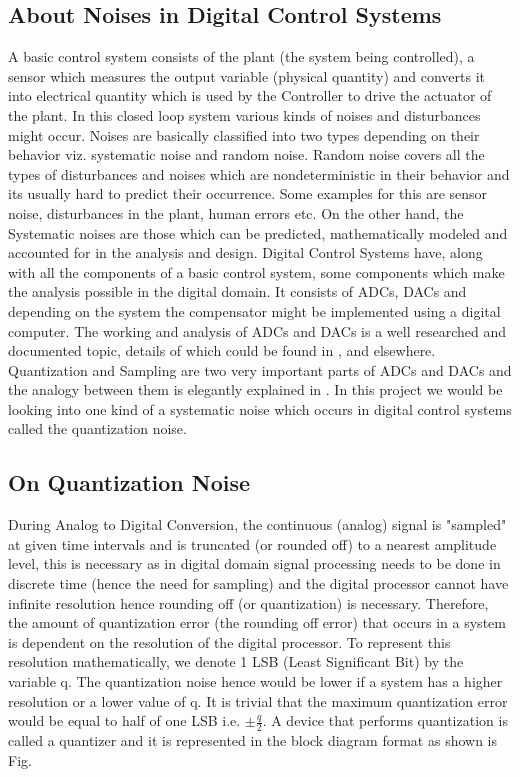 \documentclass[colorlinks=true,pdfstartview=FitV,linkcolor=blue,
            citecolor=red,urlcolor=magenta]{ligodoc}
\begin{document}
\subsection{About Noises in Digital Control Systems} A basic control system consists of the plant (the system being controlled), a sensor which measures the output variable (physical quantity) and converts it into electrical quantity which is used by the Controller to drive the actuator of the plant. In this closed loop system various kinds of noises and disturbances might occur. Noises are basically classified into two types depending on their behavior viz. systematic noise and random noise. Random noise covers all the types of disturbances and noises which are nondeterministic in their behavior and its usually hard to predict their occurrence. Some examples for this are sensor noise, disturbances in the plant, human errors etc. On the other hand, the Systematic noises are those which can be predicted, mathematically modeled  and accounted for in the analysis and design.
Digital Control Systems have, along with all the components of a basic control system, some components which make the analysis possible in the digital domain. It consists of ADCs, DACs and depending on the system the compensator might be implemented using a digital computer. The working and analysis of ADCs and DACs is a well researched and documented topic, details of which could be found in \cite{Tretter}, \cite{Sheingold} and elsewhere. Quantization and Sampling are two very important parts of ADCs and DACs and the analogy between them is elegantly explained in \cite{Kollar}. In this project we would be looking into one kind of a systematic noise which occurs in digital control systems called the quantization noise.
\subsection{On Quantization Noise} During Analog to Digital Conversion, the continuous (analog) signal is "sampled" at given time intervals and is truncated (or rounded off) to a nearest amplitude level, this is necessary as in digital domain signal processing needs to be done in discrete time (hence the need for sampling) and the digital processor cannot have infinite resolution hence rounding off (or quantization) is necessary. Therefore, the amount of quantization error (the rounding off error) that occurs in a system is dependent on the resolution of the digital processor. To represent this resolution mathematically, we denote 1 LSB (Least Significant Bit) by the variable q. The quantization noise hence would be lower if a system has a higher resolution or a lower value of q. It is trivial that the maximum quantization error would be equal to half of one LSB i.e. $\pm\frac{q}{2}$.
A device that performs quantization is called a quantizer and it is represented in the block diagram format as shown is Fig. \\
\end{document}
